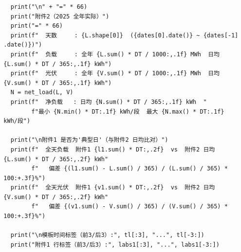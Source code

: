 \begin{verbatim}
    print("\n" + "=" * 66)
    print("附件2（2025 全年实际）")
    print("=" * 66)
    print(f"  天数     : {L.shape[0]}  ({dates[0].date()} ~ {dates[-1]
  .date()})")
    print(f"  负载     : 全年 {L.sum() * DT / 1000:,.1f} MWh  日均
  {L.sum() * DT / 365:,.1f} kWh")
    print(f"  光伏     : 全年 {V.sum() * DT / 1000:,.1f} MWh  日均
  {V.sum() * DT / 365:,.1f} kWh")
    N = net_load(L, V)
    print(f"  净负载   : 日均 {N.sum() * DT / 365:,.1f} kWh  "
          f"最小 {N.min() * DT:.1f} kWh/段  最大 {N.max() * DT:.1f}
  kWh/段")

    print("\n附件1 是否为'典型日'（与附件2 日均比对）")
    print(f"  全天负载  附件1 {l1.sum() * DT:,.2f}  vs  附件2 日均
  {L.sum() * DT / 365:,.2f} kWh"
          f"   偏差 {(l1.sum() - L.sum() / 365) / (L.sum() / 365) *
  100:+.3f}%")
    print(f"  全天光伏  附件1 {v1.sum() * DT:,.2f}  vs  附件2 日均
  {V.sum() * DT / 365:,.2f} kWh"
          f"   偏差 {(v1.sum() - V.sum() / 365) / (V.sum() / 365) *
  100:+.3f}%")

    print("\n模板时间标签（前3/后3）:", tl[:3], "...", tl[-3:])
    print("附件1 行标签（前3/后3）:", labs1[:3], "...", labs1[-3:])
\end{verbatim}

